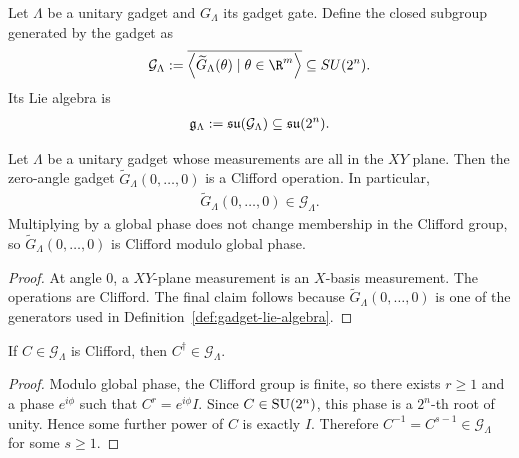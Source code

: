 \begin{definition}
\label{def:gadget-lie-algebra}
Let $\Lambda$ be a unitary gadget and $G_\Lambda$ its gadget gate. Define the closed subgroup generated by the gadget as
\begin{align}
    \mathcal{G}_\Lambda
    :=
    \overline{
    \left\langle
    \widetilde{G}_\Lambda(\theta)
    \mid
    \theta \in \R^m
    \right\rangle
    }
    \subseteq
    SU(2^n).
\end{align}
Its Lie algebra is
\begin{align}
    \mathfrak{g}_\Lambda
    :=
    \mathfrak{su}(\mathcal{G}_\Lambda)
    \subseteq
    \mathfrak{su}(2^n).
\end{align}
\end{definition}

\begin{lemma}
\label{lemma:zero-angle-clifford}
Let $\Lambda$ be a unitary gadget whose measurements are all in the $XY$ plane. Then the zero-angle gadget $\widetilde{G}_\Lambda(0,\ldots,0)$ is a Clifford operation. In particular,
\begin{align}
    \widetilde{G}_\Lambda(0,\ldots,0)
    \in
    \mathcal{G}_\Lambda.
\end{align}
Multiplying by a global phase does not change membership in the
Clifford group, so \(\widetilde G_\Lambda(0,\ldots,0)\) is Clifford modulo
global phase.
\end{lemma}

\begin{proof}
At angle $0$, a $XY$-plane measurement is an $X$-basis measurement. The operations are Clifford. The final claim follows because $\widetilde{G}_\Lambda(0,\ldots,0)$ is one of the generators used in Definition~\ref{def:gadget-lie-algebra}.
\end{proof}

\begin{lemma}
\label{lemma:clifford-inverses-available}
If $C \in \mathcal{G}_\Lambda$ is Clifford, then $C^\dagger \in \mathcal{G}_\Lambda$.
\end{lemma}

\begin{proof}
Modulo global phase, the Clifford group is finite, so there exists \(r\ge1\)
and a phase \(e^{i\phi}\) such that \(C^r=e^{i\phi}I\). Since
\(C\in\operatorname{SU}(2^n)\), this phase is a \(2^n\)-th root of unity. Hence some further
power of \(C\) is exactly \(I\). Therefore \(C^{-1}=C^{s-1}\in\mathcal G_\Lambda\)
for some \(s\ge1\).
\end{proof}

